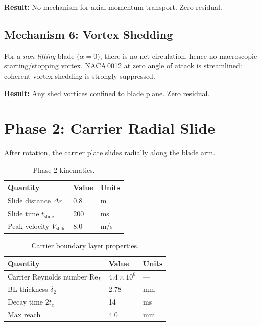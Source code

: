 \documentclass[11pt,a4paper]{article}
\begin{document}
\textbf{Result:} No mechanism for axial momentum transport. Zero residual.


\subsection{Mechanism 6: Vortex Shedding}

For a \emph{non-lifting} blade ($\alpha = 0$), there is no net circulation,
hence no macroscopic starting/stopping vortex. NACA\,0012 at zero angle
of attack is streamlined: coherent vortex shedding is strongly suppressed.

\textbf{Result:} Any shed vortices confined to blade plane. Zero residual.


\section{Phase 2: Carrier Radial Slide}
\label{sec:phase2}

After rotation, the carrier plate slides radially along the blade arm.

\begin{table}[H]
\centering
\caption{Phase 2 kinematics.}
\label{tab:phase2_kin}
\begin{tabular}{lll}
\toprule
Quantity & Value & Units \\
\midrule
Slide distance $\Delta r$ & 0.8 & m \\
Slide time $t_\mathrm{slide}$ & 200 & ms \\
Peak velocity $V_\mathrm{slide}$ & 8.0 & m/s \\
\bottomrule
\end{tabular}
\end{table}

\begin{table}[H]
\centering
\caption{Carrier boundary layer properties.}
\label{tab:carrier_BL}
\begin{tabular}{lll}
\toprule
Quantity & Value & Units \\
\midrule
Carrier Reynolds number Re$_L$ & $4.4 \times 10^6$ & --- \\
BL thickness $\delta_2$ & 2.78 & mm \\
Decay time $2t_e$ & 14 & ms \\
Max reach & 4.0 & mm \\
\bottomrule
\end{tabular}
\end{table}
\end{document}
